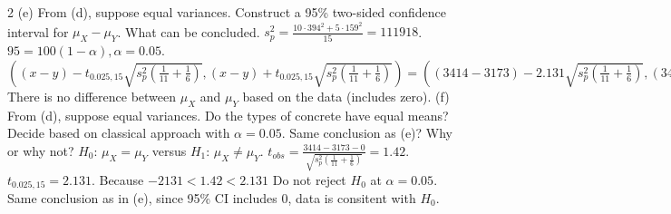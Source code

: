 \documentclass[9pt]{article}
\begin{document}
\begin{multicols*}{2}
    (e) From (d), suppose equal variances. Construct a 95\% two-sided confidence interval for $\mu_X - \mu_Y$. What can be concluded.
    $s_p^2 = \frac{10\cdot 394^2+5\cdot 159^2}{15}=111918$. $95=100(1-\alpha), \alpha=0.05$. $((x-y) - t_{0.025,15}\sqrt{s_p^2(\frac{1}{11}+\frac{1}{6})}, (x-y) + t_{0.025,15}\sqrt{s_p^2(\frac{1}{11}+\frac{1}{6})}) = ((3414-3173) - 2.131\sqrt{s_p^2(\frac{1}{11}+\frac{1}{6})}, (3414-3173) + 2.131\sqrt{s_p^2(\frac{1}{11}+\frac{1}{6})}) = (-120.8, 602.8)$ There is no difference between $\mu_X$ and $\mu_Y$ based on the data (includes zero).\newline
    (f) From (d), suppose equal variances. Do the types of concrete have equal means? Decide based on classical approach with $\alpha=0.05$. Same conclusion as (e)? Why or why not?
    $H_0$: $\mu_X = \mu_Y$ versus $H_1$: $\mu_X\not= \mu_Y$. $t_{obs}=\frac{3414-3173-0}{\sqrt{s_p^2(\frac{1}{11} + \frac{1}{6})}} = 1.42$. $t_{0.025,15}=2.131$. Because $-2131 < 1.42 < 2.131$ Do not reject $H_0$ at $\alpha = 0.05$. Same conclusion as in (e), since 95\% CI includes 0, data is consitent with $H_0$.
\end{multicols*}
\end{document}

